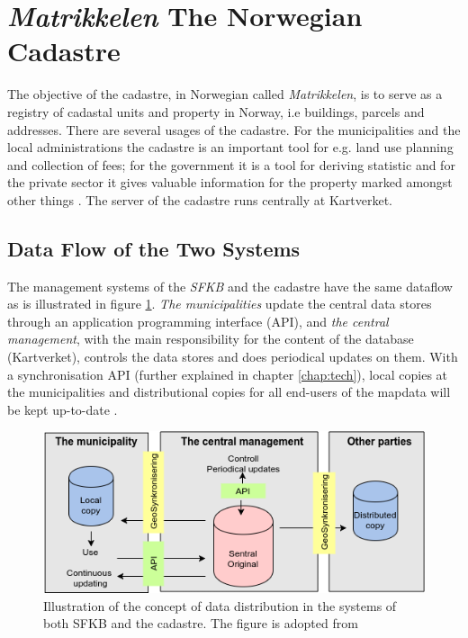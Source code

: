 
\section{\textit{Matrikkelen} The Norwegian Cadastre}\label{cadastre}

The objective of the cadastre, in Norwegian called \textit{Matrikkelen}, is to serve as a registry of cadastal units and property in Norway, i.e buildings, parcels and addresses. There are several usages of  the cadastre. For the municipalities and the local administrations the cadastre is an important tool for e.g. land use planning and collection of fees; for the government it is a tool for deriving statistic and for the private sector it gives valuable information for the property marked amongst other things \citep{Mjos2002}. The server of the cadastre runs centrally at Kartverket.  


\subsection{Data Flow of the Two Systems}
The management systems of the \textit{SFKB} and the cadastre have the same dataflow as is illustrated in figure \ref{fig:konsept}. \textit{The municipalities}  update the central data stores through an application programming interface (API), and \textit{the central management}, with the main responsibility for the content of the database (Kartverket), controls the data stores and does periodical updates on them. With a synchronisation API (further explained in chapter \ref{chap:tech}), local copies at the municipalities and distributional copies for all end-users of the mapdata will be kept up-to-date \citep{Kartverket2015}.


\begin{figure}[H]
	\centering
	\includegraphics[scale=0.8]{img/consept.png}
	\caption{Illustration of the concept of data distribution in the systems of both SFKB and the cadastre. The figure is adopted from \cite{Kartverket2015} }
	\label{fig:konsept}
\end{figure}


